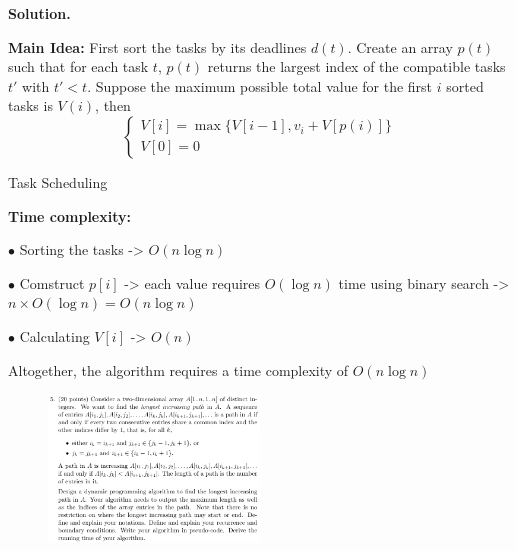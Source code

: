 \documentclass[10pt]{article}
\begin{document}
\textbf{Solution.}

\textbf{Main Idea:} First sort the tasks by its deadlines $d(t)$. Create an array $p(t)$ such that for each task $t$, $p(t)$ returns the largest index of the compatible tasks $t'$ with $t'<t$. Suppose the maximum possible total value for the first $i$ sorted tasks is $V(i)$, then
\[
\begin{cases}
	V[i] = \max\{V[i-1], v_i + V[p(i)]\} \\
	V[0] = 0
\end{cases}
\]

\begin{algorithm}
	\SetAlgoLined
	
	
	\caption{Task Scheduling}
\end{algorithm}

\textbf{Time complexity:}

\(\bullet\) Sorting the tasks -> $O(n\log n)$

\(\bullet\) Comstruct $p[i]$ -> each value requires $O(\log n)$ time using binary search -> $n\times O(\log n) = O(n\log n)$

\(\bullet\) Calculating $V[i]$ -> $O(n)$

Altogether, the algorithm requires a time complexity of $O(n\log n)$

\newpage

\begin{figure}[h]
	\centering
	\includegraphics[width=0.5\textwidth]{hw3-5}
\end{figure}
\end{document}

